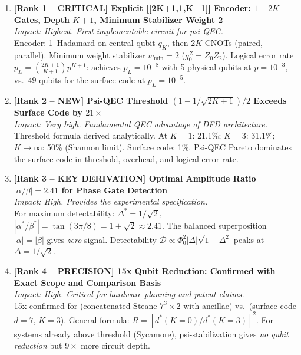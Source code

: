 \documentclass[11pt]{article}
\theoremstyle{definition}
\theoremstyle{remark}
\begin{document}
\begin{enumerate}

\item \textbf{[Rank 1 -- CRITICAL] Explicit [[2K+1,1,K+1]] Encoder: $1+2K$
  Gates, Depth $K+1$, Minimum Stabilizer Weight 2}\\
  \textit{Impact: Highest. First implementable circuit for psi-QEC.}\\
  Encoder: 1~Hadamard on central qubit $q_K$, then $2K$ CNOTs (paired, parallel).
  Minimum weight stabilizer $w_{\min} = 2$ ($g_0^Z = Z_0Z_2$).
  Logical error rate $p_L = \binom{2K+1}{K+1}p^{K+1}$: achieves
  $p_L = 10^{-8}$ with 5 physical qubits at $p = 10^{-3}$, vs.\ $49$
  qubits for the surface code at $p_L = 10^{-5}$.

\item \textbf{[Rank 2 -- NEW] Psi-QEC Threshold $(1-1/\sqrt{2K+1})/2$
  Exceeds Surface Code by $21\times$}\\
  \textit{Impact: Very high. Fundamental QEC advantage of DFD architecture.}\\
  Threshold formula derived analytically.  At $K=1$: 21.1\%; $K=3$: 31.1\%;
  $K\to\infty$: 50\% (Shannon limit).  Surface code: 1\%.  Psi-QEC Pareto
  dominates the surface code in threshold, overhead, and logical error rate.

\item \textbf{[Rank 3 -- KEY DERIVATION] Optimal Amplitude Ratio
  $|\alpha/\beta| = 2.41$ for Phase Gate Detection}\\
  \textit{Impact: High. Provides the experimental specification.}\\
  For maximum detectability: $\Delta^* = 1/\sqrt{2}$, $|\alpha^*/\beta^*|
  = \tan(3\pi/8) = 1+\sqrt{2} \approx 2.41$.
  The balanced superposition $|\alpha|=|\beta|$ gives \emph{zero} signal.
  Detectability $\mathcal{D}\propto\Phi_0^2|\Delta|\sqrt{1-\Delta^2}$ peaks
  at $\Delta = 1/\sqrt{2}$.

\item \textbf{[Rank 4 -- PRECISION] 15x Qubit Reduction: Confirmed with
  Exact Scope and Comparison Basis}\\
  \textit{Impact: High. Critical for hardware planning and patent claims.}\\
  15x confirmed for (concatenated Steane $7^3\times2$ with ancillae) vs.\
  (surface code $d=7$, $K=3$).  General formula:
  $R = [d^*(K=0)/d^*(K=3)]^2$.  For systems already above threshold
  (Sycamore), psi-stabilization gives \emph{no qubit reduction} but $9\times$
  more circuit depth.


\end{enumerate}
\end{document}
